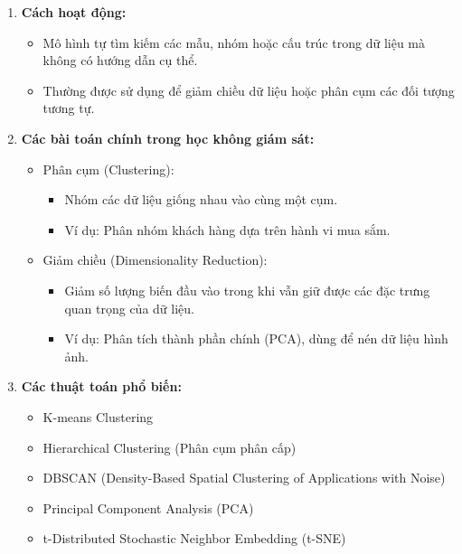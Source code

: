 \documentclass[13pt]{article}
\begin{document}
\begin{enumerate}
\begin{enumerate}
        \item \textbf{Cách hoạt động:}
        \begin{itemize}
            \item Mô hình tự tìm kiếm các mẫu, nhóm hoặc cấu trúc trong dữ liệu mà không có hướng dẫn cụ thể.
            \item Thường được sử dụng để giảm chiều dữ liệu hoặc phân cụm các đối tượng tương tự.
        \end{itemize}
        \item \textbf{Các bài toán chính trong học không giám sát:}
        \begin{itemize}
            \item Phân cụm (Clustering):
            \begin{itemize}
                \item Nhóm các dữ liệu giống nhau vào cùng một cụm.
                \item Ví dụ: Phân nhóm khách hàng dựa trên hành vi mua sắm.
            \end{itemize}
            \item Giảm chiều (Dimensionality Reduction):
            \begin{itemize}
                \item Giảm số lượng biến đầu vào trong khi vẫn giữ được các đặc trưng quan trọng của dữ liệu.
                \item Ví dụ: Phân tích thành phần chính (PCA), dùng để nén dữ liệu hình ảnh.            \end{itemize}
        \end{itemize}
        \item \textbf{Các thuật toán phổ biến:}
        \begin{itemize}
            \item K-means Clustering
            \item Hierarchical Clustering (Phân cụm phân cấp)
            \item DBSCAN (Density-Based Spatial Clustering of Applications with Noise)
            \item Principal Component Analysis (PCA)
            \item t-Distributed Stochastic Neighbor Embedding (t-SNE)
        \end{itemize}


\end{enumerate}
\end{enumerate}
\end{document}
